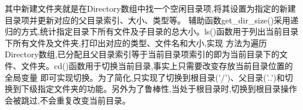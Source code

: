 其中新建文件夹就是在Directory数组中找一个空闲目录项,将其设置为指定的新建目录项并更新对应的父目录索引、大小、类型等。
辅助函数get\_dir\_size()采用递归的方式,统计指定目录下所有文件及子目录的总大小。ls()函数用于列出当前目录下所有文件及文件夹,打印出对应的类型、文件名和大小,实现
方法为遍历Directory数组,已分配且父目录索引等于当前目录项索引的即为当前目录下的文件、文件夹。cd()函数用于切换当前目录,事实上只需要改变存放当前目录位置的全局变量
即可实现切换。为了简化,只实现了切换到根目录('/')、父目录('..')和切换到下级指定文件夹的功能。另外为了鲁棒性,当处于根目录时,切换到根目录操作会被跳过,不会重复改变当前目录。